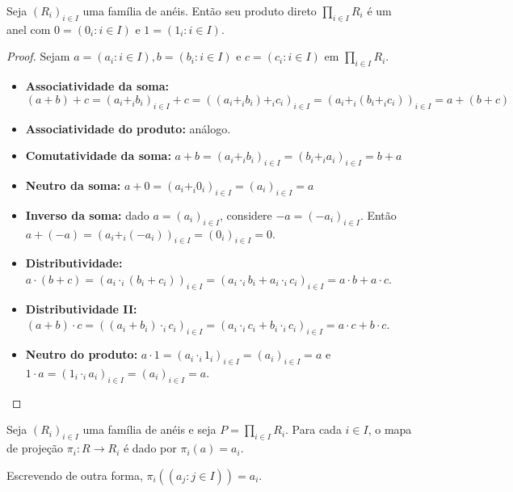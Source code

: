 \begin{lemma}
    Seja $(R_i)_{i \in I}$ uma família de anéis.
    Então seu produto direto $\prod_{i \in I}R_i$ é um anel com $0=(0_i: i \in I)$ e $1=(1_i: i \in I)$.
\end{lemma}

\begin{proof}
    Sejam $a=(a_i: i \in I), b=(b_i: i \in I)$ e $c=(c_i: i \in I)$ em $\prod_{i \in I}R_i$.
    \begin{itemize}
        \item \textbf{Associatividade da soma:} $(a+b)+c=(a_i+_i b_i)_{i \in I}+c=((a_i+_i b_i)+_ic_i)_{i \in I}=(a_i+_i (b_i+_i c_i))_{i \in I}=a+(b+c)$
        \item \textbf{Associatividade do produto:} análogo.
        \item \textbf{Comutatividade da soma:} $a+b=(a_i+_i b_i)_{i \in I}=(b_i+_i a_i)_{i \in I}=b+a$
        \item \textbf{Neutro da soma:} $a+0=(a_i+_i 0_i)_{i \in I}=(a_i)_{i \in I}=a$
        \item \textbf{Inverso da soma:} dado $a=(a_i)_{i \in I}$, considere $-a=(-a_i)_{i \in I}$. Então $a+(-a)=(a_i+_i (-a_i))_{i \in I}=(0_i)_{i \in I}=0$.
        \item \textbf{Distributividade:} $a\cdot (b+c)=(a_i\cdot _i (b_i+c_i))_{i \in I}=(a_i\cdot _i b_i+a_i\cdot _i c_i)_{i \in I}=a\cdot b+a\cdot c$.
        \item \textbf{Distributividade II:} $(a+b)\cdot c=((a_i+b_i)\cdot _i c_i)_{i \in I}=(a_i\cdot _i c_i+b_i\cdot _i c_i)_{i \in I}=a\cdot c+b\cdot c$.
        \item \textbf{Neutro do produto:} $a\cdot 1=(a_i\cdot _i 1_i)_{i \in I}=(a_i)_{i \in I}=a$ e $1\cdot a=(1_i\cdot _i a_i)_{i \in I}=(a_i)_{i \in I}=a$.
    \end{itemize}
\end{proof}
\begin{definition}
    Seja $(R_i)_{i \in I}$ uma família de anéis e seja $P=\prod_{i \in I}R_i$.
    Para cada $i \in I$, o mapa de projeção $\pi_i:R\rightarrow R_i$ é dado por $\pi_i(a)=a_i$.

    Escrevendo de outra forma, $\pi_i((a_j: j \in I))=a_i$.
\end{definition}

